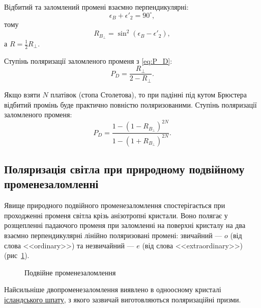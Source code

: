 Відбитий та заломлений промені
взаємно перпендикулярні:
\begin{equation*}
    \epsilon_B + \epsilon'_2 = 90^\circ,
\end{equation*}
тому
\begin{equation*}
    R_{B_\perp} = \sin^2(\epsilon_B - \epsilon'_2),
\end{equation*}
а $R = \frac12 R_\perp$.

Ступінь поляризації заломленого променя з \eqref{eq:P_D}:
\begin{equation*}
    P_D = \frac{R_\perp}{2 - R_\perp}.
\end{equation*}


Якщо взяти $ N $ платівок (стопа Столетова), то при падінні під кутом Брюстера відбитий промінь буде практично повністю поляризованими. Ступінь поляризації заломленого променя:
\begin{equation}\label{eq:P_stopa}
    P_D = \frac{1 - (1 - R_{B_\perp})^{2N}}{1 - (1 + R_{B_\perp})^{2N}}.
\end{equation}




\subsection*{Поляризація світла при природному подвійному променезаломленні}


Явище природного подвійного променезаломлення спостерігається при
проходженні променя світла крізь анізотропні кристали. Воно полягає у
розщепленні падаючого променя при заломленні на поверхні кристалу на
два взаємно перпендикулярні лінійно поляризовані промені: звичайний ---
$o$ (від слова <<ordinary>>) та незвичайний --- $e$ (від слова <<extraordinary>>) (рис~\ref{pic:double_refraction}).




\begin{figure}[h!]\centering

\caption{Подвійне променезаломлення}
\label{pic:double_refraction}
\end{figure}

Найсильніше двопроменезаломлення виявлено в одноосному кристалі
\href{https://www.youtube.com/watch?v=eq9NE2qQzTo}{ісландського шпату}, з якого зазвичай виготовляються поляризаційні
призми.

